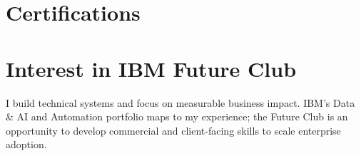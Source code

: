 \documentclass[11pt,a4paper,sans]{moderncv}
\begin{document}
\section{Certifications}

\section{Interest in IBM Future Club}
I build technical systems and focus on measurable business impact. IBM's Data \& AI and Automation portfolio maps to my experience; the Future Club is an opportunity to develop commercial and client-facing skills to scale enterprise adoption.

\vfill
\end{document}
